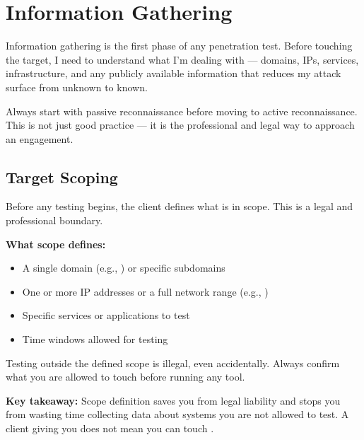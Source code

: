 \chapter{Information Gathering}
\label{ch:info_gathering}

Information gathering is the first phase of any penetration test. Before touching
the target, I need to understand what I'm dealing with --- domains, IPs, services,
infrastructure, and any publicly available information that reduces my attack surface
from unknown to known.

\begin{notebox}
Always start with passive reconnaissance before moving to active reconnaissance.
This is not just good practice --- it is the professional and legal way to approach
an engagement.
\end{notebox}

\section{Target Scoping}
\label{sec:target_scoping}

Before any testing begins, the client defines what is in scope. This is a legal
and professional boundary.

\textbf{What scope defines:}
\begin{itemize}
  \item A single domain (e.g., ) or specific subdomains
  \item One or more IP addresses or a full network range (e.g., )
  \item Specific services or applications to test
  \item Time windows allowed for testing
\end{itemize}

\begin{warnbox}
Testing outside the defined scope is illegal, even accidentally. Always confirm
what you are allowed to touch before running any tool.
\end{warnbox}

\begin{takebox}
\textbf{Key takeaway:} Scope definition saves you from legal liability and stops you
from wasting time collecting data about systems you are not allowed to test.
A client giving you  does not mean you can touch .
\end{takebox}

